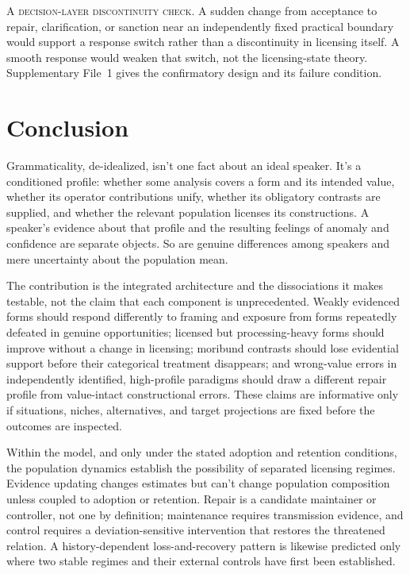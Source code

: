 \documentclass[12pt,letterpaper]{article}
\begin{document}
\noindent\textsc{A decision-layer discontinuity check.} A sudden change from
acceptance to repair, clarification, or sanction near an independently fixed
practical boundary would support a response switch rather than a discontinuity
in licensing itself. A smooth response would weaken that switch, not the
licensing-state theory. Supplementary File~1 gives the confirmatory design and
its failure condition.

\clearpage
\section{Conclusion}

Grammaticality, de-idealized, isn't one fact about an ideal speaker. It's a
conditioned profile: whether some analysis covers a form and its intended value,
whether its operator contributions unify, whether its obligatory contrasts are
supplied, and whether the relevant population licenses its constructions. A
speaker's evidence about that profile and the resulting feelings of anomaly and
confidence are separate objects. So are genuine differences among speakers and
mere uncertainty about the population mean.

The contribution is the integrated architecture and the dissociations it makes
testable, not the claim that each component is unprecedented. Weakly evidenced
forms should respond differently to framing and exposure from forms repeatedly
defeated in genuine opportunities; licensed but processing-heavy forms should
improve without a change in licensing; moribund contrasts should lose
evidential support before their categorical treatment disappears; and
wrong-value errors in independently identified, high-profile paradigms should
draw a different repair profile from value-intact constructional errors. These
claims
are informative only if situations, niches, alternatives, and target
projections are fixed before the outcomes are inspected.

Within the model, and only under the stated adoption and retention conditions,
the population dynamics establish the possibility of separated licensing
regimes.
Evidence updating changes estimates but can't change population composition
unless coupled to adoption or retention. Repair is a candidate maintainer or
controller, not one by definition; maintenance requires transmission evidence,
and control requires a deviation-sensitive intervention that restores the
threatened relation. A history-dependent loss-and-recovery pattern is likewise predicted only where
two stable regimes and their external controls have first been established.
\end{document}
